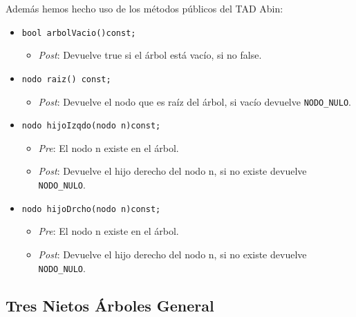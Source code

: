 Además hemos hecho uso de los métodos públicos del TAD Abin:
\begin{itemize}
  \item \verb|bool arbolVacio()const;|
  \begin{itemize}
    \item \textit{Post}: Devuelve true si el árbol está vacío, si no false.
  \end{itemize}
  \item \verb|nodo raiz() const;|
  \begin{itemize}
    \item \textit{Post}: Devuelve el nodo que es raíz del árbol, si vacío devuelve \texttt{NODO\_NULO}.
  \end{itemize}
  \item \verb|nodo hijoIzqdo(nodo n)const;|
  \begin{itemize}
    \item \textit{Pre}: El nodo n existe en el árbol.
    \item \textit{Post}: Devuelve el hijo derecho del nodo n, si no existe devuelve \texttt{NODO\_NULO}.
  \end{itemize}
  \item \verb|nodo hijoDrcho(nodo n)const;|
  \begin{itemize}
    \item \textit{Pre}: El nodo n existe en el árbol.
    \item \textit{Post}: Devuelve el hijo derecho del nodo n, si no existe devuelve \texttt{NODO\_NULO}.
  \end{itemize}
\end{itemize}

\newpage
\subsection*{Tres Nietos Árboles General}


